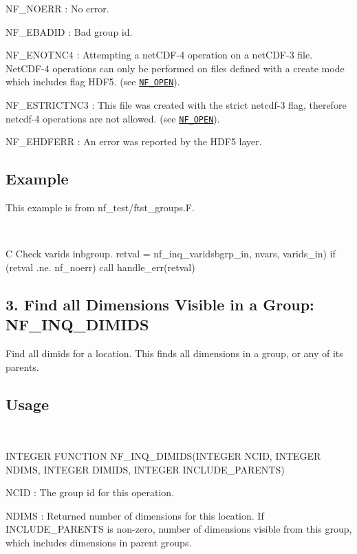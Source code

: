 {\ttfamily N\+F\+\_\+\+N\+O\+E\+RR} \+: No error.

{\ttfamily N\+F\+\_\+\+E\+B\+A\+D\+ID} \+: Bad group id.

{\ttfamily N\+F\+\_\+\+E\+N\+O\+T\+N\+C4} \+: Attempting a net\+C\+D\+F-\/4 operation on a net\+C\+D\+F-\/3 file. Net\+C\+D\+F-\/4 operations can only be performed on files defined with a create mode which includes flag H\+D\+F5. (see \href{#NF_005fOPEN}{\tt N\+F\+\_\+\+O\+P\+EN}).

{\ttfamily N\+F\+\_\+\+E\+S\+T\+R\+I\+C\+T\+N\+C3} \+: This file was created with the strict netcdf-\/3 flag, therefore netcdf-\/4 operations are not allowed. (see \href{#NF_005fOPEN}{\tt N\+F\+\_\+\+O\+P\+EN}).

{\ttfamily N\+F\+\_\+\+E\+H\+D\+F\+E\+RR} \+: An error was reported by the H\+D\+F5 layer.

\subsection*{Example }

This example is from nf\+\_\+test/ftst\+\_\+groups.\+F.

 

C Check varids inbgroup. retval = nf\+\_\+inq\+\_\+varidsbgrp\+\_\+in, nvars, varids\+\_\+in) if (retval .ne. nf\+\_\+noerr) call handle\+\_\+err(retval)\hypertarget{nc_f77_interface_guide_f77_NF-INQ-DIMIDS}{}\subsection{3. Find all Dimensions Visible in a Group\+: N\+F\+\_\+\+I\+N\+Q\+\_\+\+D\+I\+M\+I\+D\+S }\label{nc_f77_interface_guide_f77_NF-INQ-DIMIDS}
Find all dimids for a location. This finds all dimensions in a group, or any of its parents.

\subsection*{Usage }

 

I\+N\+T\+E\+G\+ER F\+U\+N\+C\+T\+I\+ON N\+F\+\_\+\+I\+N\+Q\+\_\+\+D\+I\+M\+I\+D\+S(\+I\+N\+T\+E\+G\+E\+R N\+C\+I\+D, I\+N\+T\+E\+G\+E\+R N\+D\+I\+M\+S, I\+N\+T\+E\+G\+E\+R D\+I\+M\+I\+D\+S, I\+N\+T\+E\+G\+E\+R I\+N\+C\+L\+U\+D\+E\+\_\+\+P\+A\+R\+E\+N\+T\+S)

{\ttfamily N\+C\+ID} \+: The group id for this operation.

{\ttfamily N\+D\+I\+MS} \+: Returned number of dimensions for this location. If I\+N\+C\+L\+U\+D\+E\+\_\+\+P\+A\+R\+E\+N\+TS is non-\/zero, number of dimensions visible from this group, which includes dimensions in parent groups.

